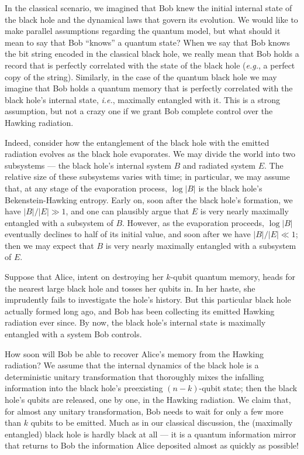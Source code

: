 \documentclass[11pt]{article}
\begin{document}
In the classical scenario, we imagined that Bob knew the initial internal state of the black hole and the dynamical laws that govern its evolution. We would like to make parallel assumptions regarding the quantum model, but what should it mean to say that Bob ``knows'' a quantum state? When we say that Bob knows the bit string encoded in the classical black hole, we really mean that Bob holds a record that is perfectly correlated with the state of the black hole ({\em e.g.}, a perfect copy of the string). Similarly, in the case of the quantum black hole we may imagine that Bob holds a quantum memory that is perfectly correlated with the black hole's internal state, {\em i.e.}, maximally entangled with it. This is a strong assumption, but not a crazy one if we grant Bob complete control over the Hawking radiation. 

Indeed, consider how the entanglement of the black hole with the emitted radiation evolves as the black hole evaporates. We may divide the world into two subsystems --- the black hole's internal system $B$ and radiated system $E$. The relative size  of these subsystems varies with time; in particular, we may assume that, at any stage of the evaporation process, $\log |B|$ is the black hole's Bekenstein-Hawking entropy. Early on, soon after the black hole's formation, we have $|B|/|E|\gg 1$, and one can plausibly argue \cite{page-entropy,lubkin,lloyd} that $E$ is very nearly maximally entangled with a subsystem of $B$. However, as the evaporation proceeds,  $\log |B|$ eventually declines to half of its initial value, and soon after we have $|B|/|E| \ll 1$; then we may expect that $B$ is very nearly maximally entangled with a subsystem of $E$.  

Suppose that Alice, intent on destroying her $k$-qubit quantum memory, heads for the nearest large black hole and tosses her qubits in. In her haste, she imprudently fails to investigate the hole's history. But this particular black hole actually formed long ago, and Bob has been collecting its emitted Hawking radiation ever since. By now, the black hole's internal state is maximally entangled with a system Bob controls.

How soon will Bob be able to recover Alice's memory from the Hawking radiation? We assume that the internal dynamics of the black hole is a deterministic unitary transformation that thoroughly mixes the infalling information into the black hole's preexisting $(n-k)$-qubit state; then the black hole's qubits are released, one by one, in the Hawking radiation.  We claim that, for almost any unitary transformation,  Bob needs to wait for only a few more than $k$ qubits to be emitted. Much as in our classical discussion, the (maximally entangled) black hole is hardly black at all --- it is a quantum information mirror that returns to Bob the information Alice deposited almost as quickly as possible!
\end{document}
